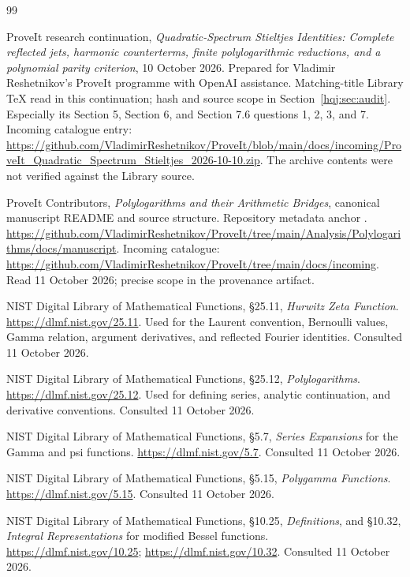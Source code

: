 \begingroup\raggedright
\begin{thebibliography}{99}
ProveIt research continuation,
\emph{Quadratic-Spectrum Stieltjes Identities: Complete reflected jets,
harmonic counterterms, finite polylogarithmic reductions, and a polynomial
parity criterion}, 10 October 2026. Prepared for Vladimir Reshetnikov's
ProveIt programme with OpenAI assistance. Matching-title Library TeX
read in this continuation; hash and source scope in Section~\ref{hqj:sec:audit}.
Especially its Section 5, Section 6, and Section 7.6 questions 1, 2, 3,
and 7. Incoming catalogue entry:
\url{https://github.com/VladimirReshetnikov/ProveIt/blob/main/docs/incoming/ProveIt_Quadratic_Spectrum_Stieltjes_2026-10-10.zip}.
The archive contents were not verified against the Library source.

ProveIt Contributors,
\emph{Polylogarithms and their Arithmetic Bridges}, canonical manuscript
README and source structure. Repository metadata anchor \pin.
\url{https://github.com/VladimirReshetnikov/ProveIt/tree/main/Analysis/Polylogarithms/docs/manuscript}.
Incoming catalogue:
\url{https://github.com/VladimirReshetnikov/ProveIt/tree/main/docs/incoming}.
Read 11 October 2026; precise scope in the provenance artifact.

NIST Digital Library of Mathematical Functions,
\S25.11, \emph{Hurwitz Zeta Function}.
\url{https://dlmf.nist.gov/25.11}.
Used for the Laurent convention, Bernoulli values, Gamma relation,
argument derivatives, and reflected Fourier identities. Consulted
11 October 2026.

NIST Digital Library of Mathematical Functions,
\S25.12, \emph{Polylogarithms}.
\url{https://dlmf.nist.gov/25.12}.
Used for defining series, analytic continuation, and derivative
conventions. Consulted 11 October 2026.

NIST Digital Library of Mathematical Functions,
\S5.7, \emph{Series Expansions} for the Gamma and psi functions.
\url{https://dlmf.nist.gov/5.7}. Consulted 11 October 2026.

NIST Digital Library of Mathematical Functions,
\S5.15, \emph{Polygamma Functions}.
\url{https://dlmf.nist.gov/5.15}. Consulted 11 October 2026.

NIST Digital Library of Mathematical Functions,
\S10.25, \emph{Definitions}, and \S10.32,
\emph{Integral Representations} for modified Bessel functions.
\url{https://dlmf.nist.gov/10.25}; \url{https://dlmf.nist.gov/10.32}.
Consulted 11 October 2026.


\end{thebibliography}
